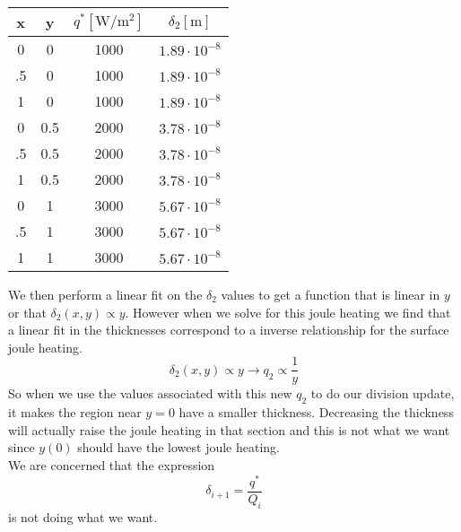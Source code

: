\documentclass[12pt]{article}
\begin{document}
\begin{table}[H]
\centering
\begin{tabular}{c c c c}
\hline \hline
x & y & $q^* [\si{\watt \per \meter^2}]$ & $\delta_{2} [\si{\meter}]$ \\ [0.5ex] 
\hline
0 & 0 & 1000 & $1.89\cdot10^{-8}$ \\
.5 & 0 & 1000& $1.89\cdot10^{-8}$\\
1 & 0 & 1000& $1.89\cdot10^{-8}$\\
0 & 0.5 & 2000& $3.78\cdot10^{-8}$\\
.5 & 0.5 & 2000& $3.78\cdot10^{-8}$\\
1 &0.5 & 2000& $3.78\cdot10^{-8}$\\
0 &1 & 3000& $5.67\cdot10^{-8}$\\
.5 &1 & 3000& $5.67\cdot10^{-8}$\\
1 &1 & 3000& $5.67\cdot10^{-8}$\\
\end{tabular}
\end{table}
We then perform a linear fit on the $\delta_2$ values to get a function that is linear in $y$ or that $\delta_2(x,y) \propto y$.
However when we solve for this joule heating we find that a linear fit in the thicknesses correspond to a inverse relationship for the surface joule heating.
\[
\delta_2(x,y) \propto y \rightarrow q_2 \propto \frac{1}{y}
\]
So when we use the values associated with this new $q_2$ to do our division update, it makes the region near $y=0$ have a smaller thickness.
Decreasing the thickness will actually raise the joule heating in that section and this is not what we want since $y(0)$ should have the lowest joule heating.
\\
We are concerned that the expression
\[
\delta_{i+1} = \frac{q^*}{Q_i}
\]
is not doing what we want.
\pagebreak
\end{document}
